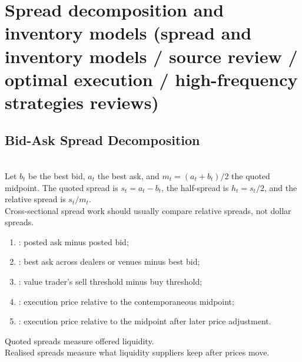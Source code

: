 \documentclass[a4paper,oneside,openany]{book}
\begin{document}
\section*{Spread decomposition and inventory models (spread and inventory models / source review / optimal execution / high-frequency strategies reviews)}

\subsection*{Bid-Ask Spread Decomposition}

\begin{definition} \\
Let $b_t$ be the best bid, $a_t$ the best ask, and $m_t=(a_t+b_t)/2$ the quoted midpoint. The quoted spread is $s_t=a_t-b_t$, the half-spread is $h_t=s_t/2$, and the relative spread is $s_t/m_t$.\\
Cross-sectional spread work should usually compare relative spreads, not dollar spreads.
\end{definition}

\begin{taxonomy} 
\begin{enumerate}[label=\roman*.]
\setlength{\itemsep}{0pt}
\item {}: posted ask minus posted bid;
\item {}: best ask across dealers or venues minus best bid;
\item {}: value trader's sell threshold minus buy threshold;
\item {}: execution price relative to the contemporaneous midpoint;
\item {}: execution price relative to the midpoint after later price adjustment.
\end{enumerate}
Quoted spreads measure offered liquidity.\\
Realised spreads measure what liquidity suppliers keep after prices move.
\end{taxonomy}
\end{document}
